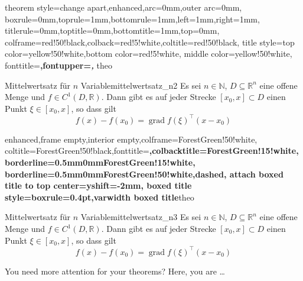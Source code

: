\begin{dispExample}
%
  {theorem style=change apart,enhanced,arc=0mm,outer arc=0mm,
  boxrule=0mm,toprule=1mm,bottomrule=1mm,left=1mm,right=1mm,
  titlerule=0mm,toptitle=0mm,bottomtitle=1mm,top=0mm,
  colframe=red!50!black,colback=red!5!white,coltitle=red!50!black,
  title style={top color=yellow!50!white,bottom color=red!5!white,
    middle color=yellow!50!white},
  fonttitle=\bfseries\sffamily\normalsize,fontupper=\normalsize\itshape,
  }{theo}

\begin{YetAnotherTheorem}{Mittelwertsatz f\"{u}r $n$ Variable}{mittelwertsatz_n2}%
  Es sei $n\in\mathbb{N}$, $D\subseteq\mathbb{R}^n$ eine offene Menge und
  $f\in C^{1}(D,\mathbb{R})$. Dann gibt es auf jeder Strecke
  $[x_0,x]\subset D$ einen Punkt $\xi\in[x_0,x]$, so dass gilt
  \begin{equation*}
  f(x)-f(x_0) = \operatorname{grad} f(\xi)^{\top}(x-x_0)
  \end{equation*}
\end{YetAnotherTheorem}
\end{dispExample}


\begin{dispExample}
%
{enhanced,frame empty,interior empty,colframe=ForestGreen!50!white,
  coltitle=ForestGreen!50!black,fonttitle=\bfseries,colbacktitle=ForestGreen!15!white,
  borderline={0.5mm}{0mm}{ForestGreen!15!white},
  borderline={0.5mm}{0mm}{ForestGreen!50!white,dashed},
  attach boxed title to top center={yshift=-2mm},
  boxed title style={boxrule=0.4pt},varwidth boxed title}{theo}

\begin{YetAnotherTheorem}{Mittelwertsatz f\"{u}r $n$ Variable}{mittelwertsatz_n3}%
  Es sei $n\in\mathbb{N}$, $D\subseteq\mathbb{R}^n$ eine offene Menge und
  $f\in C^{1}(D,\mathbb{R})$. Dann gibt es auf jeder Strecke
  $[x_0,x]\subset D$ einen Punkt $\xi\in[x_0,x]$, so dass gilt
  \begin{equation*}
  f(x)-f(x_0) = \operatorname{grad} f(\xi)^{\top}(x-x_0)
  \end{equation*}
\end{YetAnotherTheorem}
\end{dispExample}


\clearpage
You need more attention for your theorems? Here, you are \ldots

